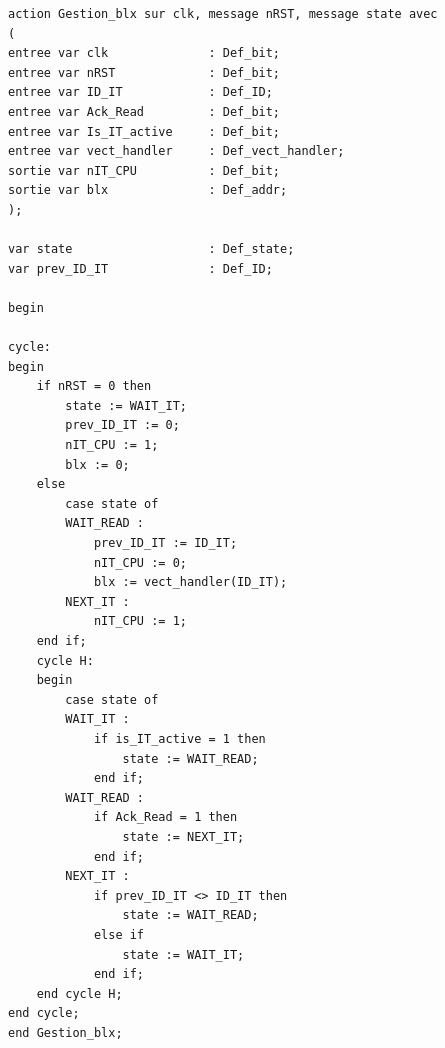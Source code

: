 \begin{lstlisting}[style=pascalstyle]
action Gestion_blx sur clk, message nRST, message state avec
(
entree var clk 				: Def_bit;
entree var nRST 			: Def_bit;
entree var ID_IT 			: Def_ID;
entree var Ack_Read 		: Def_bit;
entree var Is_IT_active 	: Def_bit;
entree var vect_handler 	: Def_vect_handler;
sortie var nIT_CPU 			: Def_bit;
sortie var blx 				: Def_addr;
);

var state 					: Def_state;
var prev_ID_IT 				: Def_ID;

begin

cycle:
begin
	if nRST = 0 then
		state := WAIT_IT;
		prev_ID_IT := 0;
		nIT_CPU := 1;
		blx := 0;
	else
		case state of
		WAIT_READ :
			prev_ID_IT := ID_IT;
			nIT_CPU := 0;
			blx := vect_handler(ID_IT);
		NEXT_IT :
			nIT_CPU := 1;
	end if;
	cycle H:
	begin
		case state of
		WAIT_IT :
			if is_IT_active = 1 then
				state := WAIT_READ;
			end if;
		WAIT_READ :
			if Ack_Read = 1 then
				state := NEXT_IT;
			end if;
		NEXT_IT :
			if prev_ID_IT <> ID_IT then
				state := WAIT_READ;
			else if 
				state := WAIT_IT;
			end if;
	end cycle H;
end cycle;
end Gestion_blx;
\end{lstlisting}